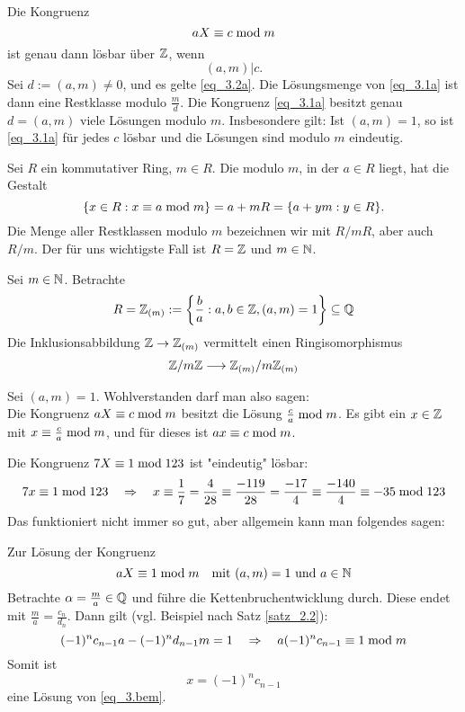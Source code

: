 \begin{falko} \label{F3.5}
	Die Kongruenz
	\begin{equation}
		aX \kon c \modu m \label{eq_3.1a}
	\end{equation}
	ist genau dann lösbar über $\ZZ$, wenn
	\begin{equation}
		(a,m) | c. \label{eq_3.2a}
	\end{equation}
	Sei $d := (a,m) \neq 0$, und es gelte \eqref{eq_3.2a}. Die Lösungsmenge von \eqref{eq_3.1a} ist dann eine Restklasse modulo $\frac{m}{d}$. Die Kongruenz \eqref{eq_3.1a} besitzt genau $d = (a,m)$ viele Lösungen modulo $m$. Insbesondere gilt: Ist $(a,m) = 1$, so ist \eqref{eq_3.1a} für jedes $c$ lösbar und die Lösungen sind modulo $m$ eindeutig. 
\end{falko}

\setcounter{defn}{1}
\begin{defn} \label{def_3.2a}
	Sei $R$ ein kommutativer Ring, $m \in R$. Die  modulo $m$, in der $a \in R$ liegt, hat die Gestalt
	\[ \{x \in R : x \kon a \modu m\} = a+mR = \{a + ym : y \in R\}. \]
	Die Menge aller Restklassen modulo $m$ bezeichnen wir mit $R/mR$, aber auch $R/m$. Der für uns wichtigste Fall ist $R = \ZZ$ und $m \in \NN$.
\end{defn}

	Sei $m \in \NN$. Betrachte
	\[R = \ZZ_{(m)} := \penbrace*{ \frac{b}{a} : a,b \in \ZZ, (a,m) = 1} \subseteq \QQ \]
	Die Inklusionsabbildung $\ZZ \rightarrow \ZZ_{(m)}$ vermittelt einen Ringisomorphismus
	\begin{equation}
		\ZZ/m\ZZ \longrightarrow \ZZ_{(m)}/m\ZZ_{(m)}
	\end{equation}
	
	Sei $(a,m) = 1$. Wohlverstanden darf man also sagen: \\
	Die Kongruenz $aX \kon c \modu m$ besitzt die Lösung $\frac{c}{a} \modu m$. Es gibt ein $x \in \ZZ$ mit $x \kon \frac{c}{a} \modu m$, und für dieses ist $ax \kon c \modu m$.
	
	Die Kongruenz $7X \kon 1 \modu 123$ ist "eindeutig" lösbar:
	\[ 7x \kon 1 \modu 123 \quad \Rightarrow \quad x \kon \frac{1}{7} = \frac{4}{28} \kon \frac{-119}{28} = \frac{-17}{4} \kon \frac{-140}{4} \kon -35 \modu 123 \]
	Das funktioniert nicht immer so gut, aber allgemein kann man folgendes sagen:
	
	Zur Lösung der Kongruenz
	\begin{equation}
		aX \kon 1 \modu m \quad \text{mit } (a,m) = 1 \text{ und } a \in \NN \label{eq_3.bem}
	\end{equation}
	Betrachte $\alpha = \frac{m}{a} \in \QQ$ und führe die Kettenbruchentwicklung durch. Diese endet mit $\frac{m}{a} = \frac{c_n}{d_n}$. Dann gilt (vgl. Beispiel nach Satz \ref{satz_2.2}):
	\[ (-1)^n c_{n-1}a - (-1)^n d_{n-1} m = 1 \quad \Rightarrow \quad a(-1)^n c_{n-1} \kon 1 \modu m \]
	Somit ist
	\[ x = (-1)^n c_{n-1} \]
	eine Lösung von \eqref{eq_3.bem}.
	
